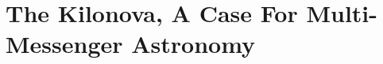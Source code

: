 \begin{comment}

Li \& Paczynski (1998, LP98) first showed that the radioactive ejecta from a NS-NS or BH-NS merger provides a source for powering transient emission, in analogy with Type Ia SNe. 
Given the low mass and high velocity of the ejecta from a NS-NS/BH-NS merger, they concluded that the ejecta will become transparent to its own radiation quickly, producing emission which peaks on a timescale of about one day, much faster than for normal SNe (which instead peak on a timescale of weeks or longer).

Freiburghaus et al. (1999) presented the first explicit calculations showing that the ejecta properties extracted from a hydrodynamical simulation of a NS-NS merger (Rosswog et al. 1999) indeed produces abundance patterns in basic accord with the solar system r-process.

In the late 50's Burbidge et al. (1957) and Cameron (1957) had already proposed that approximately half of the elements heavier than iron are synthesized via the capture of neutrons onto lighter seed nuclei (e.g., iron) in a dense neutron-rich environment in which the timescale for neutron capture is shorter than the $\beta$-decay timescale.
Rapid neutron capture process', or r-process for short, 
Despite this mechanism was known for long time, the astrophysical environments in which this happens remained a mystery.
They showed that the radioactive heating rate was relatively insensitive to the precise electron fraction of the ejecta, and they were the first to consider how efficiently the decay products thermalize their energy in the ejecta.

The type of radiation depends on the EOS for the ejecta and its thermodynamical properties. Opacity, nucleon and particle content, pressure, temperature, MHD state.

Li \& Paczynski (1998, LP98) first showed that the radioactive ejecta from a NS-NS or BH-NS merger provides a source for powering transient emission, in analogy with Type Ia SNe. Given the low mass and high velocity of the ejecta from a NS-NS/BH-NS merger, they concluded that the ejecta will become transparent to its own radiation quickly, producing emission which peaks on a timescale of about one day, much faster than for normal SNe (which instead peak on a timescale of weeks or longer).

\end{comment}


\section{The Kilonova, A Case For Multi-Messenger Astronomy} \label{kilonovachapter}

